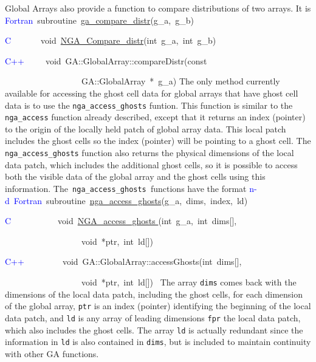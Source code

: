 Global Arrays also provide a function to compare distributions of
two arrays. It is
\textcolor{blue}{Fortran}~subroutine~\href{http://www.emsl.pnl.gov/docs/global/ga_ops.html\#ga_compare_distr}{ga\_{}compare\_{}distr}(g\_a,~g\_b)

\textcolor{blue}{C}~~~~~~~void~\href{http://www.emsl.pnl.gov/docs/global/c_nga_ops.html\#ga_compare_distr}{NGA\_{}Compare\_{}distr}(int~g\_a,~int~g\_b)~

\textcolor{blue}{C++}~~~~~void~GA::GlobalArray::compareDistr(const~

~~~~~~~~~~~~~~~~~~GA::GlobalArray~{*}~g\_a)
The only method currently available for accessing the ghost cell data
for global arrays that have ghost cell data is to use the \texttt{nga\_access\_ghosts}
funtion. This function is similar to the\texttt{ nga\_access} function
already described, except that it returns an index (pointer) to the
origin of the locally held patch of global array data. This local
patch includes the ghost cells so the index (pointer) will be pointing
to a ghost cell. The \texttt{nga\_access\_ghosts} function also returns
the physical dimensions of the local data patch, which includes the
additional ghost cells, so it is possible to access both the visible
data of the global array and the ghost cells using this information.
The\texttt{ nga\_access\_ghosts }functions have the format
\textcolor{blue}{n-d~Fortran}~subroutine~\href{http://www.emsl.pnl.gov/docs/global/ga_ops.html\#ga_access_ghosts}{nga\_{}access\_{}ghosts}(g\_a,~dims,~index,~ld)~

\textcolor{blue}{C}~~~~~~~~~~~void~\href{http://www.emsl.pnl.gov/docs/global/c_nga_ops.html\#nga_access_ghosts}{NGA\_{}access\_{}ghosts }(int~g\_a,~int~dims{[}{]},~

~~~~~~~~~~~~~~~~~~void~{*}ptr,~int~ld{[}{]})~

\textcolor{blue}{C++~}~~~~~~~~void~GA::GlobalArray::accessGhosts(int~dims{[}{]},

~~~~~~~~~~~~~~~~~~void~{*}ptr,~int~ld{[}{]})~
The array \texttt{dims} comes back with the dimensions of the local
data patch, including the ghost cells, for each dimension of the global
array, \texttt{ptr} is an index (pointer) identifying the beginning
of the local data patch, and \texttt{ld} is any array of leading dimensions
\texttt{fpr} the local data patch, which also includes the ghost cells.
The array \texttt{ld} is actually redundant since the information
in \texttt{ld} is also contained in \texttt{dims}, but is included
to maintain continuity with other GA functions.



